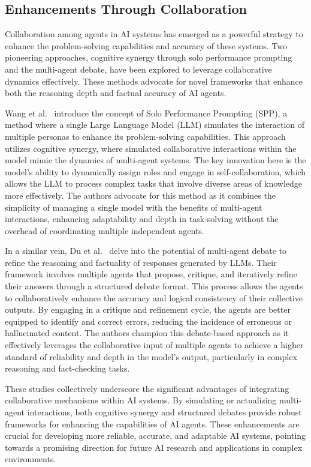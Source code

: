 \subsection{Enhancements Through Collaboration}
Collaboration among agents in AI systems has emerged as a powerful strategy to enhance the problem-solving capabilities and accuracy of these systems. Two pioneering approaches, cognitive synergy through solo performance prompting and the multi-agent debate, have been explored to leverage collaborative dynamics effectively. These methods advocate for novel frameworks that enhance both the reasoning depth and factual accuracy of AI agents.

Wang et al.~\cite{wang2024unleashing} introduce the concept of Solo Performance Prompting (SPP), a method where a single Large Language Model (LLM) simulates the interaction of multiple personas to enhance its problem-solving capabilities. This approach utilizes cognitive synergy, where simulated collaborative interactions within the model mimic the dynamics of multi-agent systems. The key innovation here is the model's ability to dynamically assign roles and engage in self-collaboration, which allows the LLM to process complex tasks that involve diverse areas of knowledge more effectively. The authors advocate for this method as it combines the simplicity of managing a single model with the benefits of multi-agent interactions, enhancing adaptability and depth in task-solving without the overhead of coordinating multiple independent agents.

In a similar vein, Du et al.~\cite{du2023improving} delve into the potential of multi-agent debate to refine the reasoning and factuality of responses generated by LLMs. Their framework involves multiple agents that propose, critique, and iteratively refine their answers through a structured debate format. This process allows the agents to collaboratively enhance the accuracy and logical consistency of their collective outputs. By engaging in a critique and refinement cycle, the agents are better equipped to identify and correct errors, reducing the incidence of erroneous or hallucinated content. The authors champion this debate-based approach as it effectively leverages the collaborative input of multiple agents to achieve a higher standard of reliability and depth in the model’s output, particularly in complex reasoning and fact-checking tasks.

These studies collectively underscore the significant advantages of integrating collaborative mechanisms within AI systems. By simulating or actualizing multi-agent interactions, both cognitive synergy and structured debates provide robust frameworks for enhancing the capabilities of AI agents. These enhancements are crucial for developing more reliable, accurate, and adaptable AI systems, pointing towards a promising direction for future AI research and applications in complex environments.



